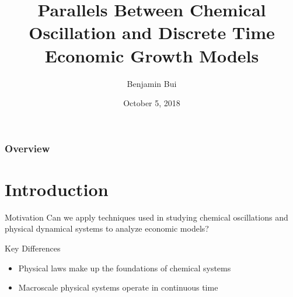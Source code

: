 \documentclass{beamer}
\title{Parallels Between Chemical Oscillation and Discrete Time Economic Growth Models}
\author{Benjamin Bui}
\date{October 5, 2018}
\begin{document}
\begin{frame}
	\titlepage
\end{frame}

\begin{frame}
	\frametitle{Overview}
	\tableofcontents
\end{frame}

\section{Introduction}
\begin{frame}{Motivation}
	Can we apply techniques used in studying chemical oscillations and physical dynamical systems to analyze economic models?
\end{frame}

\begin{frame}{Key Differences}
	\begin{itemize}
		\item
			Physical laws make up the foundations of chemical systems

		\item
			Macroscale physical systems operate in continuous time
	\end{itemize}
\end{frame}
\end{document}
